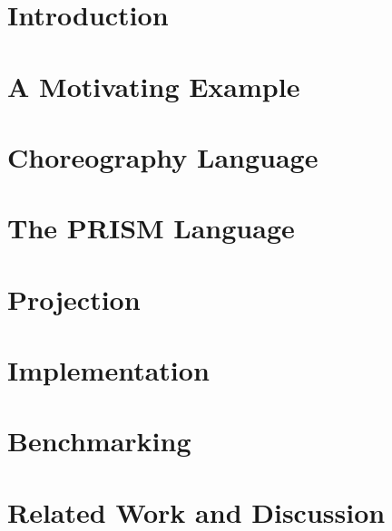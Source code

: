 \documentclass{lmcs} %
\theoremstyle{plain}\newtheorem{satz}[thm]{Satz} %
\begin{document}
\maketitle

\section{Introduction}\label{sec:intro}


\section{A Motivating Example}\label{sec:example}


\section{Choreography Language}\label{sec:chor}


\section{The PRISM Language}\label{sec:prism}


\section{Projection}\label{sec:proj}


\section{Implementation}\label{sec:impl}

\section{Benchmarking}\label{sec:bench}


\section{Related Work and Discussion}



%


\end{document}
